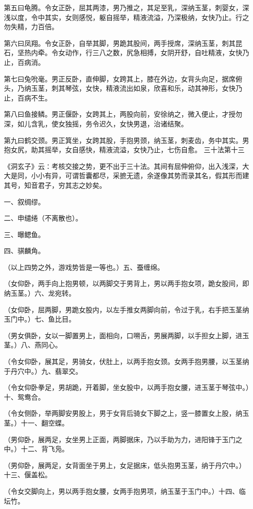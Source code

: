 \documentclass[a4paper,12pt,UTF8,twoside]{ctexbook}
\begin{document}
第五曰龟腾。令女正卧，屈其两漆，男乃推之，其足至乳，深纳玉茎，刺婴女，深浅以度，令中其实，女则感悦，躯自摇举，精液流溢，乃深极纳，女快乃止。行之勿失精，力百倍。

第六曰凤翔。令女正卧，自举其脚，男跪其股间，两手授席，深纳玉茎，刺其昆石，坚热内牵。令女动作，行三八之数，尻急相搏，女阴开舒，自吐精液，女快乃止，百病消。

第七曰兔吮毫。男正反卧，直伸脚，女跨其上，膝在外边，女背头向足，据席俯头，乃纳玉茎，刺其琴弦，女快，精液流出如泉，欣喜和乐，动其神形，女快乃止，百病不生。

第八曰鱼接鳞。男正偃卧，女跨其上，两股向前，安徐纳之，微入便止，才授勿深，如儿含乳，使女独摇，务令迟久，女快男退，治诸结聚。

第九曰鹤交颈。男正箕坐，女跨其股，手抱男颈，纳玉茎，刺麦齿，务中其实。男抱女尻，助其摇举，女自感快，精液流溢，女快乃止，七伤自愈。
三十法第十三

《洞玄子》云∶考核交接之势，更不出于三十法。其间有屈伸俯仰，出入浅深，大大是同，小小有异，可谓哲囊都尽，采摭无遗，余遂像其势而录其名，假其形而建其号，知音君子，穷其志之妙矣。

一、叙绸缪。

二、申缱绻（不离散也）。

三、曝鳃鱼。

四、骐麟角。

（以上四势之外，游戏势皆是一等也。）五、蚕缠绵。

（女仰卧，两手向上抱男顿，以两脚交于男背上，男以两手抱女项，跪女股间，即纳玉茎。）六、龙宛转。

（女仰卧，屈两脚，男跪女股内，以左手推女两脚向前，令过于乳，右手把玉茎纳玉门中。）七、鱼比目。

（男女俱卧，女以一脚置男上，面相向，口嗍舌，男展两脚，以手担女上脚，进玉茎。）八、燕同心。

（令女仰卧，展其足，男骑女，伏肚上，以两手抱女颈。女两手抱男腰，以玉茎纳于丹穴中。）九、翡翠交。

（令女仰卧拳足，男胡跪，开着脚，坐女股中，以两手抱女腰，进玉茎于琴弦中。）十、鸳鸯合。

（令女侧卧，举两脚安男股上，男于女背后骑女下脚之上，竖一膝置女上股，纳玉茎。）十一、翻空蝶。

（男仰卧，展两足，女坐男上正面，两脚据床，乃以手助为力，进阳锋于玉门之中。）十二、背飞凫。

（男仰卧，展两足，女背面坐于男上，女足据床，低头抱男玉茎，纳于丹穴中。）十三、偃盖松。

（令女交脚向上，男以两手抱女腰，女两手抱男项，纳玉茎于玉门中。）十四、临坛竹。
\end{document}
